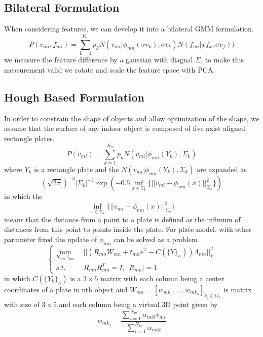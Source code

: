 \subsection{Bilateral Formulation}
When considering features, we can develop it into a bilateral GMM formulation.
\begin{equation}
P(v_{mi},f_{mi})=\sum^{K_n}_{k=1}p_kN(v_{mi}|\phi_{mn}(xv_k),\sigma v_k)N(f_{mi}|xf_k,\sigma v_f))
\end{equation}
we measure the feature difference by a gaussian with diagnal $\Sigma$, to make this measurement valid we rotate and scale the feature space with PCA.
\subsection{Hough Based Formulation}
In order to constrain the shape of objects and allow optimization of the shape, we assume that the surface of any indoor object is composed of five axist aligned rectangle plates.
\begin{equation}
\label{equ:hough}
P(v_{mi})=\sum^{K_n}_{k=1}p_kN(v_{mi}|\phi_{mn}(Y_k),\Sigma_k)
\end{equation}
where $Y_k$ is a rectangle plate and the $N(v_{mi}|\phi_{mn}(Y_k),\Sigma_k)$ are expanded as
$$
(\sqrt{2\pi})^{-3}|\Sigma_k|^{-1}\exp(-0.5\inf_{x\in Y_k}\{||v_{mi}-\phi_{mn}(x)||^2_{\Sigma_k}\})
$$
in which the $$\inf_{x \in Y_k}\{||v_{mi}-\phi_{mn}(x)||^2_{\Sigma_k}\}$$ means that the distance from a point to a plate is defined as the infimum of distances from this point to points inside the plate. 
For plate model, with other parameter fixed the update of $\phi_{mn}$ can be solved as a problem
\begin{equation}
\left\{
\begin{aligned}
\min_{R_{mn},t_{mn}}~&~|| (R_{mn}W_{mn} + t_{mn}e^{T} - C(\{Y\}_n))\Lambda_{mn}||^2_{F} \\
s.t.~&~R_{mn}R_{mn}^{T}=I,~|R_{mn}|=1
\end{aligned}
\right.
\end{equation}
in which $C(\{Y_k\}_n)$ is a $3 \times 5$ matrix with each column being a center coordinates of a plate in nth object
and $W_{mn}=[w_{mk_1},...,w_{mk_5}]_{k_j \in O_n}$ is matrix with size of $3 \times 5$ and each column being a virtual 3D point given by
$$w_{mk_j}=\frac{\sum^{N_m}_{i=1}\alpha_{mik}v_{mi}}{\sum^{N_m}_{i=1}\alpha_{mik}}$$
